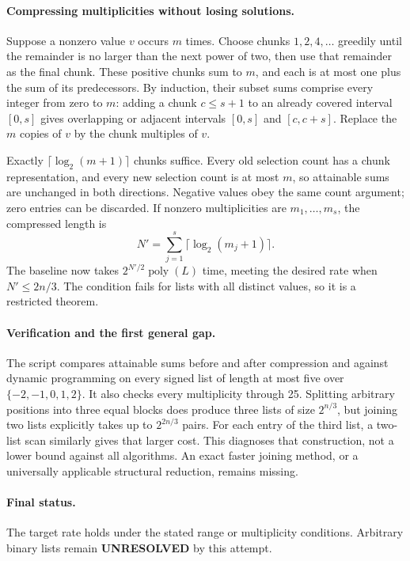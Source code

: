 \documentclass[11pt,a4paper]{article}
\begin{document}
\paragraph{Compressing multiplicities without losing solutions.}
Suppose a nonzero value $v$ occurs $m$ times. Choose chunks $1,2,4,\ldots$ greedily until the remainder is no larger than the next power of two, then use that remainder as the final chunk. These positive chunks sum to $m$, and each is at most one plus the sum of its predecessors. By induction, their subset sums comprise every integer from zero to $m$: adding a chunk $c\le s+1$ to an already covered interval $[0,s]$ gives overlapping or adjacent intervals $[0,s]$ and $[c,c+s]$. Replace the $m$ copies of $v$ by the chunk multiples of $v$.

Exactly $\lceil\log_2(m+1)\rceil$ chunks suffice. Every old selection count has a chunk representation, and every new selection count is at most $m$, so attainable sums are unchanged in both directions. Negative values obey the same count argument; zero entries can be discarded. If nonzero multiplicities are $m_1,\ldots,m_s$, the compressed length is
\[
 N'=\sum_{j=1}^s\lceil\log_2(m_j+1)\rceil.
\]
The baseline now takes $2^{N'/2}\operatorname{poly}(L)$ time, meeting the desired rate when $N'\le2n/3$. The condition fails for lists with all distinct values, so it is a restricted theorem.

\paragraph{Verification and the first general gap.}
The script compares attainable sums before and after compression and against dynamic programming on every signed list of length at most five over $\{-2,-1,0,1,2\}$. It also checks every multiplicity through 25. Splitting arbitrary positions into three equal blocks does produce three lists of size $2^{n/3}$, but joining two lists explicitly takes up to $2^{2n/3}$ pairs. For each entry of the third list, a two-list scan similarly gives that larger cost. This diagnoses that construction, not a lower bound against all algorithms. An exact faster joining method, or a universally applicable structural reduction, remains missing.

\paragraph{Final status.}
The target rate holds under the stated range or multiplicity conditions. Arbitrary binary lists remain \textbf{UNRESOLVED} by this attempt.
\end{document}
